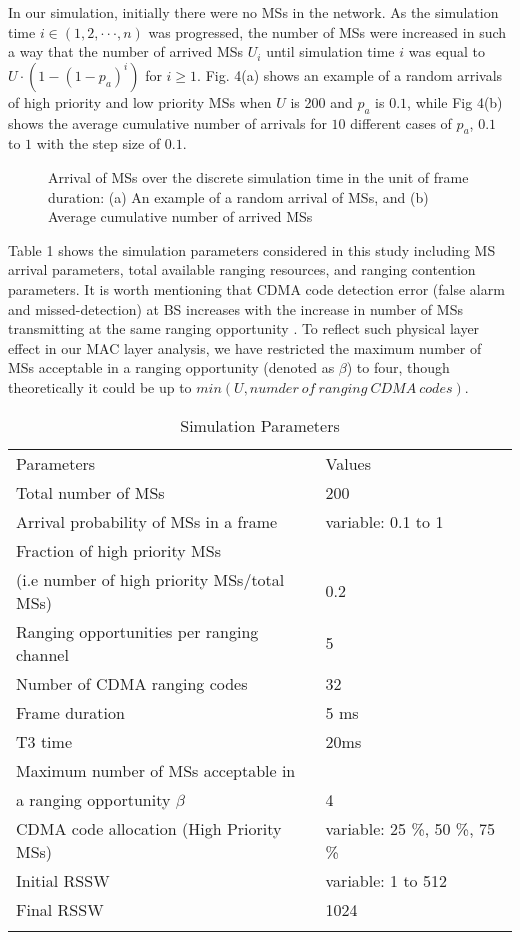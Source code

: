\documentclass[preprint,12pt]{elsarticle}
\begin{document}
In our simulation, initially there were no MSs in the network. As the simulation time $i \in (1,2,\cdot \cdot \cdot,  n)$  was progressed, the number of MSs were increased in such a way that the number of arrived MSs $U_i$ until simulation time $i$  was equal to $U\cdot(1-(1-p_a)^i)$ for $i \ge 1$. Fig. 4(a) shows an example of a random arrivals of high priority and low priority MSs when $U$  is 200 and $p_a$  is $0.1$, while Fig 4(b) shows the average cumulative number of arrivals for $10$ different cases of $p_a$, $0.1$ to $1$ with the step size of $0.1$.


\begin{figure}[h]
\centering
{}
\caption{Arrival of MSs over the discrete simulation time in the unit of frame duration: (a) An example of a random arrival of MSs, and (b) Average cumulative number of arrived MSs}
\end{figure}


Table 1 shows the simulation parameters considered in this study including MS arrival parameters, total available ranging resources, and ranging contention parameters. It is worth mentioning that CDMA code detection error (false alarm and missed-detection) at BS increases with the increase in number of MSs transmitting at the same ranging opportunity \cite{Minn}. To reflect such physical layer effect in our MAC layer analysis, we have restricted the maximum number of MSs acceptable in a ranging opportunity (denoted as $\beta$) to four, though theoretically it could be up to $min(U,numder\ of\ ranging\  CDMA\ codes)$.


\begin{table}
\caption{Simulation Parameters}
\label{Tab1}
\begin{tabular}{ll}
\hline\noalign{\smallskip}
Parameters  &  Values   \\
\noalign{\smallskip}\hline\noalign{\smallskip}
Total number of MSs & 200\\
Arrival probability of MSs in a frame & variable: 0.1  to 1\\
Fraction of high priority MSs \\(i.e number of high priority MSs/total MSs) & 0.2 \\
Ranging opportunities per ranging channel    & 5 \\
Number of CDMA ranging codes & 32\\
Frame duration & 5 ms \\
T3 time & 20ms\\
Maximum number of MSs acceptable in\\ a ranging opportunity $\beta$ & 4 \\
CDMA code allocation (High Priority MSs) & variable: 25 \%, 50 \%, 75 \% \\
Initial RSSW & variable: 1 to 512 \\
Final RSSW & 1024 \\
\noalign{\smallskip}\hline
\end{tabular}
\end{table}
\end{document}
